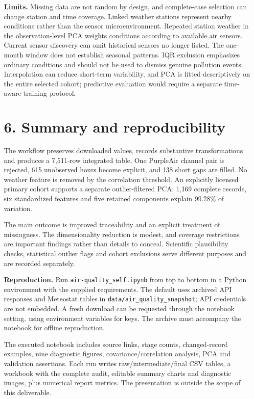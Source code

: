 \documentclass[11pt,a4paper]{article}
\begin{document}
\textbf{Limits.} Missing data are not random by design, and complete-case selection can change station and time coverage. Linked weather stations represent nearby conditions rather than the sensor microenvironment. Repeated station weather in the observation-level PCA weights conditions according to available air sensors. Current sensor discovery can omit historical sensors no longer listed. The one-month window does not establish seasonal patterns. IQR exclusion emphasizes ordinary conditions and should not be used to dismiss genuine pollution events. Interpolation can reduce short-term variability, and PCA is fitted descriptively on the entire selected cohort; predictive evaluation would require a separate time-aware training protocol.

\newpage
\section*{6. Summary and reproducibility}
The workflow preserves downloaded values, records substantive transformations and produces a 7,511-row integrated table. One PurpleAir channel pair is rejected, 615 unobserved hours become explicit, and 138 short gaps are filled. No weather feature is removed by the correlation threshold. An explicitly licensed primary cohort supports a separate outlier-filtered PCA: 1,169 complete records, six standardized features and five retained components explain 99.28\% of variation.

The main outcome is improved traceability and an explicit treatment of missingness. The dimensionality reduction is modest, and coverage restrictions are important findings rather than details to conceal. Scientific plausibility checks, statistical outlier flags and cohort exclusions serve different purposes and are recorded separately.

\textbf{Reproduction.} Run \texttt{air-quality\_self.ipynb} from top to bottom in a Python environment with the supplied requirements. The default uses archived API responses and Meteostat tables in \texttt{data/air\_quality\_snapshot}; API credentials are not embedded. A fresh download can be requested through the notebook setting, using environment variables for keys. The archive must accompany the notebook for offline reproduction.

The executed notebook includes source links, stage counts, changed-record examples, nine diagnostic figures, covariance/correlation analysis, PCA and validation assertions. Each run writes raw/intermediate/final CSV tables, a workbook with the complete audit, editable summary charts and diagnostic images, plus numerical report metrics. The presentation is outside the scope of this deliverable.
\end{document}

